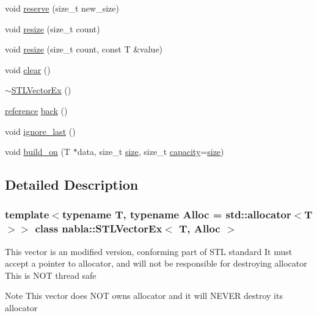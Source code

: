 \begin{DoxyCompactItemize}
\item 
void \mbox{\hyperlink{classnabla_1_1_s_t_l_vector_ex_abc4120d95527b1e5758ee5f3f37efd8d}{reserve}} (size\+\_\+t new\+\_\+size)
\item 
void \mbox{\hyperlink{classnabla_1_1_s_t_l_vector_ex_a5c67e1289e13c47ca12bfc0df7f4d746}{resize}} (size\+\_\+t count)
\item 
void \mbox{\hyperlink{classnabla_1_1_s_t_l_vector_ex_a86b60bb70244ff2cdcefb10617cc2ec7}{resize}} (size\+\_\+t count, const T \&value)
\item 
void \mbox{\hyperlink{classnabla_1_1_s_t_l_vector_ex_a262bd3464db2aff36aa6bb90dbf5e7ec}{clear}} ()
\item 
\mbox{\hyperlink{classnabla_1_1_s_t_l_vector_ex_a95dda91687a64854458b42a58c011f91}{$\sim$\+S\+T\+L\+Vector\+Ex}} ()
\item 
\mbox{\hyperlink{classnabla_1_1_s_t_l_vector_ex_a6adf5d87234352c139af2d48f4787ed5}{reference}} \mbox{\hyperlink{classnabla_1_1_s_t_l_vector_ex_a4fd7e56ad9f737416be66a7556052fc7}{back}} ()
\item 
void \mbox{\hyperlink{classnabla_1_1_s_t_l_vector_ex_a8be72171d8b6128e38d0810b27b622d8}{ignore\+\_\+last}} ()
\item 
void \mbox{\hyperlink{classnabla_1_1_s_t_l_vector_ex_a6825a8f0e938ff22f851d047f362f1dd}{build\+\_\+on}} (T $\ast$data, size\+\_\+t \mbox{\hyperlink{classnabla_1_1_s_t_l_vector_ex_a1b4a4d968613137772046331b1264e1f}{size}}, size\+\_\+t \mbox{\hyperlink{classnabla_1_1_s_t_l_vector_ex_a44ff1b69309686b9b3f1ea125982b078}{capacity}}=\mbox{\hyperlink{classnabla_1_1_s_t_l_vector_ex_a1b4a4d968613137772046331b1264e1f}{size}})
\end{DoxyCompactItemize}


\subsection{Detailed Description}
\subsubsection*{template$<$typename T, typename Alloc = std\+::allocator$<$\+T$>$$>$\newline
class nabla\+::\+S\+T\+L\+Vector\+Ex$<$ T, Alloc $>$}

This vector is an modified version, conforming part of S\+TL standard It must accept a pointer to allocator, and will not be responsible for destroying allocator This is N\+OT thread safe \begin{DoxyNote}{Note}
This vector does N\+OT owns allocator and it will N\+E\+V\+ER destroy it\textquotesingle{}s allocator 
\end{DoxyNote}



